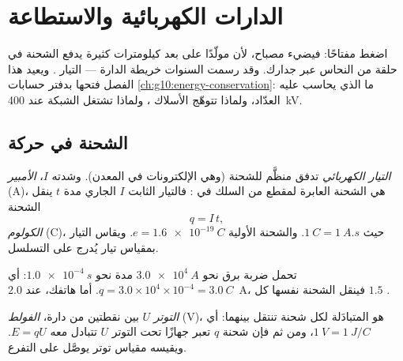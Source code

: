 \chapter{الدارات الكهربائية والاستطاعة}\label{ch:g11:circuits-and-power}

اضغط مفتاحًا: فيضيء مصباح، لأن مولّدًا على بعد كيلومترات كثيرة
يدفع الشحنة في حلقة من النحاس عبر جدارك. وقد رسمت السنوات 
خريطة الدارة --- التيار  . ويعيد هذا الفصل فتحها
بدفتر حسابات \cref{ch:g10:energy-conservation}: ما الذي يحاسب عليه
العدّاد، ولماذا تتوهّج الأسلاك ، ولماذا تشتغل الشبكة عند \qty{400}{kV}.

\section{الشحنة في حركة}

\begin{definition}\label{def:g11:circuits-and-power:current}
\emph{التيار الكهربائي} تدفق منظَّم
للشحنة (وهي الإلكترونات في المعدن). وشدته $I$، 
\emph{الأمبير} (\unit{A})، هي الشحنة العابرة
لمقطع من السلك في : فالتيار الثابت $I$ الجاري مدة
$t$ ينقل الشحنة
\[ q = I\,t , \]
 \emph{الكولوم} (\unit{C})، حيث $\qty{1}{C} =
\qty{1}{A.s}$. والشحنة الأولية $e = \qty{1.6e-19}{C}$. ويقاس التيار
بمقياس تيار يُدرج على التسلسل.
\end{definition}

\begin{example}\label{ex:g11:circuits-and-power:coulomb}
تحمل ضربة برق نحو $\qty{3.0e4}{A}$ مدة نحو
$\qty{1.0e-4}{s}$: أي $q = 3.0\times10^{4} \times 10^{-4} = \qty{3.0}{C}$.
أما هاتفك، عند \qty{2.0}{A}، فينقل الشحنة نفسها كل $1.5$ .
\end{example}

\begin{definition}\label{def:g11:circuits-and-power:voltage}
\emph{التوتر} $U$ بين نقطتين من دارة، 
\emph{الفولط} (\unit{V})، هو  المتبادَلة لكل 
شحنة تنتقل بينهما: أي $\qty{1}{V} = \qty{1}{J/C}$، ومن ثم فإن شحنة
$q$ تعبر جهازًا تحت التوتر $U$ تتبادل معه  $E = qU$.
ويقيسه مقياس توتر يوصَّل على التفرع.
\end{definition}

